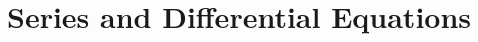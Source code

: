 \documentclass[../../main.tex]{subfiles}
\begin{document}
\chapter{Series and Differential Equations}
\end{document}
